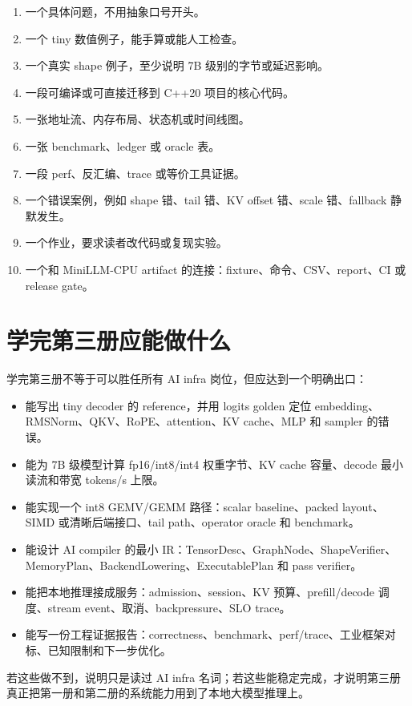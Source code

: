 \begin{rubricbox}
\begin{enumerate}
  \item 一个具体问题，不用抽象口号开头。
  \item 一个 tiny 数值例子，能手算或能人工检查。
  \item 一个真实 shape 例子，至少说明 7B 级别的字节或延迟影响。
  \item 一段可编译或可直接迁移到 C++20 项目的核心代码。
  \item 一张地址流、内存布局、状态机或时间线图。
  \item 一张 benchmark、ledger 或 oracle 表。
  \item 一段 perf、反汇编、trace 或等价工具证据。
  \item 一个错误案例，例如 shape 错、tail 错、KV offset 错、scale 错、fallback 静默发生。
  \item 一个作业，要求读者改代码或复现实验。
  \item 一个和 MiniLLM-CPU artifact 的连接：fixture、命令、CSV、report、CI 或 release gate。
\end{enumerate}
\end{rubricbox}

\section*{学完第三册应能做什么}

学完第三册不等于可以胜任所有 AI infra 岗位，但应达到一个明确出口：

\begin{itemize}
  \item 能写出 tiny decoder 的 reference，并用 logits golden 定位 embedding、RMSNorm、QKV、RoPE、attention、KV cache、MLP 和 sampler 的错误。
  \item 能为 7B 级模型计算 fp16/int8/int4 权重字节、KV cache 容量、decode 最小读流和带宽 tokens/s 上限。
  \item 能实现一个 int8 GEMV/GEMM 路径：scalar baseline、packed layout、SIMD 或清晰后端接口、tail path、operator oracle 和 benchmark。
  \item 能设计 AI compiler 的最小 IR：TensorDesc、GraphNode、ShapeVerifier、MemoryPlan、BackendLowering、ExecutablePlan 和 pass verifier。
  \item 能把本地推理接成服务：admission、session、KV 预算、prefill/decode 调度、stream event、取消、backpressure、SLO trace。
  \item 能写一份工程证据报告：correctness、benchmark、perf/trace、工业框架对标、已知限制和下一步优化。
\end{itemize}

若这些做不到，说明只是读过 AI infra 名词；若这些能稳定完成，才说明第三册真正把第一册和第二册的系统能力用到了本地大模型推理上。
